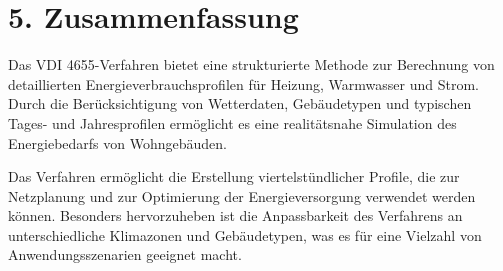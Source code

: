 \documentclass{article}
\begin{document}
\section*{5. Zusammenfassung}
Das VDI 4655-Verfahren bietet eine strukturierte Methode zur Berechnung von detaillierten Energieverbrauchsprofilen für Heizung, Warmwasser und Strom. Durch die Berücksichtigung von Wetterdaten, Gebäudetypen und typischen Tages- und Jahresprofilen ermöglicht es eine realitätsnahe Simulation des Energiebedarfs von Wohngebäuden.

Das Verfahren ermöglicht die Erstellung viertelstündlicher Profile, die zur Netzplanung und zur Optimierung der Energieversorgung verwendet werden können. Besonders hervorzuheben ist die Anpassbarkeit des Verfahrens an unterschiedliche Klimazonen und Gebäudetypen, was es für eine Vielzahl von Anwendungsszenarien geeignet macht.
\end{document}
